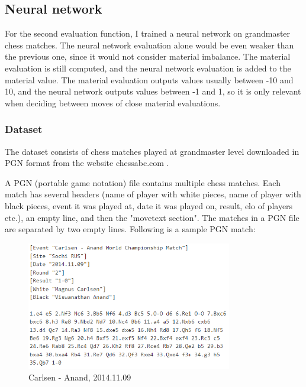 \subsection{Neural network}
\label{subsec:ch4sec3subsec2}

For the second evaluation function, I trained a neural network on grandmaster chess matches. The neural network evaluation alone would be even weaker than the previous one, since it would not consider material imbalance. The material evaluation is still computed, and the neural network evaluation is added to the material value. The material evaluation outputs values usually between -10 and 10, and the neural network outputs values between -1 and 1, so it is only relevant when deciding between moves of close material evaluations.

\subsubsection{Dataset}
\label{subsec:ch4sec3subsec2subsubsec1}

The dataset consists of chess matches played at grandmaster level downloaded in PGN format from the website chessabc.com \cite{chessabc}.

A PGN (portable game notation) file contains multiple chess matches. Each match has several headers (name of player with white pieces, name of player with black pieces, event it was played at, date it was played on, result, elo of players etc.), an empty line, and then the "movetext section". The matches in a PGN file are separated by two empty lines. Following is a sample PGN match:
\begin{figure}[h]
    \includegraphics[width=0.8\textwidth]{figures/carlsen-anand-match.png}
    \caption{Carlsen - Anand, 2014.11.09}
    \label{fig:carlsenAnandPGN}
\end{figure}

